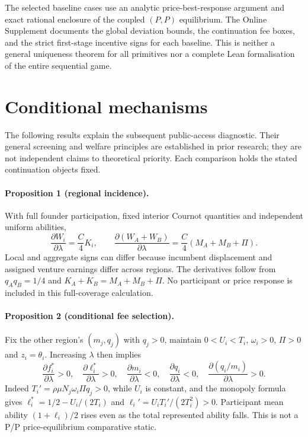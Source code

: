 \documentclass[11pt]{article}
\begin{document}
The selected baseline cases use an analytic price-best-response argument and exact rational enclosure of the coupled $(P,P)$ equilibrium. The Online Supplement documents the global deviation bounds, the continuation fee boxes, and the strict first-stage incentive signs for each baseline. This is neither a general uniqueness theorem for all primitives nor a complete Lean formalisation of the entire sequential game.

\section{Conditional mechanisms}\label{sec:propositions}

The following results explain the subsequent public-access diagnostic.
Their general screening and welfare principles are established in prior research; they are not independent claims to theoretical priority.
Each comparison holds the stated continuation objects fixed.

\paragraph{Proposition 1 (regional incidence).}
With full founder participation, fixed interior Cournot quantities and independent uniform abilities,
\begin{equation}
 \frac{\partial W_i}{\partial\lambda}=\frac{C}{4}K_i,\qquad
 \frac{\partial(W_A+W_B)}{\partial\lambda}
 =\frac{C}{4}(M_A+M_B+\Pi).
 \label{eq:P1}
\end{equation}
Local and aggregate signs can differ because incumbent displacement and assigned venture earnings differ across regions.
The derivatives follow from $q_Aq_B=1/4$ and $K_A+K_B=M_A+M_B+\Pi$.
No participant or price response is included in this full-coverage calculation.

\paragraph{Proposition 2 (conditional fee selection).}
Fix the other region's $(m_j,q_j)$ with $q_j>0$, maintain $0<U_i<T_i$, $\omega_i>0$, $\Pi>0$ and $z_i=\theta_i$.
Increasing $\lambda$ then implies
\begin{equation}
 \frac{\partial f_i^*}{\partial\lambda}>0,\quad
 \frac{\partial\ell_i^*}{\partial\lambda}>0,\quad
 \frac{\partial m_i}{\partial\lambda}<0,\quad
 \frac{\partial q_i}{\partial\lambda}<0,\quad
 \frac{\partial(q_i/m_i)}{\partial\lambda}>0.
 \label{eq:P2}
\end{equation}
Indeed $T_i'=\rho\mu N_j\omega_i\Pi q_j>0$, while $U_i$ is constant, and the monopoly formula gives
$\ell_i^*=1/2-U_i/(2T_i)$ and $\ell_i'=U_iT_i'/(2T_i^2)>0$.
Participant mean ability $(1+\ell_i)/2$ rises even as the total represented ability falls.
This is not a P/P price-equilibrium comparative static.
\end{document}
